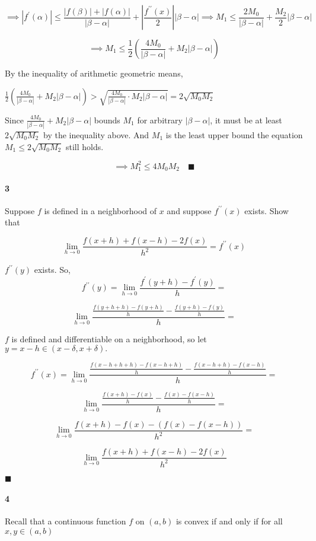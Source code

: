 \documentclass{article}
\begin{document}
\[\implies |f^\prime(\alpha)| \leq \frac{|f(\beta)|+|f(\alpha)|}{|\beta -\alpha|} + \left|\frac{f^{\prime\prime}(x)}{2}\right||\beta-\alpha| \implies M_1 \leq \frac{2M_0}{|\beta -\alpha|} +
  \frac{M_2}{2}|\beta-\alpha| \]

\[\implies M_1 \leq \frac{1}{2} (\frac{4M_0}{|\beta-\alpha|}+M_2|\beta-\alpha|)\]


By the inequality of arithmetic geometric means,

$\frac{1}{2} (\frac{4M_0}{|\beta-\alpha|}+M_2|\beta-\alpha|) >
\sqrt{\frac{4M_0}{|\beta-\alpha|}\cdot M_2|\beta-\alpha|} = 2\sqrt{M_0M_2}$

Since $\frac{4M_0}{|\beta-\alpha|}+M_2|\beta-\alpha|$ bounds $M_1$  for arbitrary $|\beta-\alpha|$,
it must be at least $2\sqrt{M_0M_2}$ by the inequality above. And
$M_1$ is the least upper bound the equation $M_1\leq 2\sqrt{M_0M_2}$
still holds.

\[\implies M_1^2 \leq 4M_0M_2\quad \blacksquare\]

\newpage
\paragraph{3} Suppose $f$ is defined in a neighborhood of $x$ and
suppose $f^{\prime\prime}(x)$ exists. Show that

\[\lim_{h\rightarrow 0} \frac{f(x+h) +f(x-h) -2f(x)}{h^2} = f^{\prime\prime}(x)\]


$f^{\prime\prime}(y)$ exists. So,
\[f^{\prime\prime}(y) = \lim_{h\rightarrow 0} \frac{f^\prime(y+h) -f^\prime(y)}{h}=\]

\[ \lim_{h\rightarrow 0} \frac{\frac{f(y+h+h)-f(y+h)}{h} -
    \frac{f(y+h) -f(y)}{h}}{h}=\]

$f$ is defined and differentiable on a neighborhood, so let $y = x-h
\in (x-\delta,x+\delta).$

\[f^{\prime\prime}(x) = \lim_{h\rightarrow 0} \frac{\frac{f(x - h +h+h)-f(x -h +h)}{h} -
    \frac{f(x-h+h) -f(x-h)}{h}}{h}=\]

\[ \lim_{h\rightarrow 0} \frac{\frac{f(x +h)-f(x)}{h} -
    \frac{f(x) -f(x-h)}{h}}{h}=\]

\[ \lim_{h\rightarrow 0} \frac{f(x + h) -f(x) -(f(x) -f(x-h))}{h^2}=\]

\[ \lim_{h\rightarrow 0} \frac{f(x + h) +f(x-h) -2f(x)}{h^2}\]

$\blacksquare$

\newpage
\paragraph{4} Recall that a continuous function $f$ on $(a, b)$ is
convex if and only if for all $x, y\in (a,b)$
\end{document}
